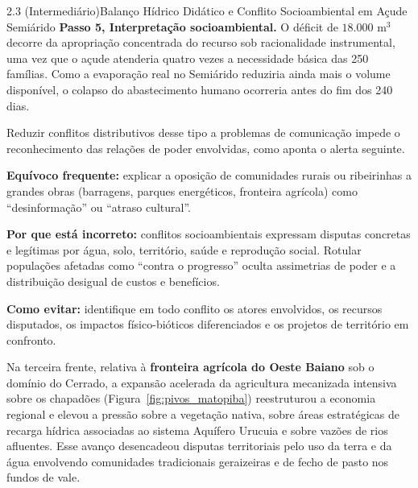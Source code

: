 \begin{boxExemplo}{2.3 (Intermediário)}{Balanço Hídrico Didático e Conflito Socioambiental em Açude Semiárido}
{\textbf{Passo 5, Interpretação socioambiental.} O déficit de $18.000\text{ m}^3$ decorre da apropriação concentrada do recurso sob racionalidade instrumental, uma vez que o açude atenderia quatro vezes a necessidade básica das 250 famílias. Como a evaporação real no Semiárido reduziria ainda mais o volume disponível, o colapso do abastecimento humano ocorreria antes do fim dos 240 dias.}
\end{boxExemplo}

Reduzir conflitos distributivos desse tipo a problemas de comunicação impede o reconhecimento das relações de poder envolvidas, como aponta o alerta seguinte.

\begin{boxErro}
\textbf{Equívoco frequente:} explicar a oposição de comunidades rurais ou ribeirinhas a grandes obras (barragens, parques energéticos, fronteira agrícola) como ``desinformação'' ou ``atraso cultural''.

\textbf{Por que está incorreto:} conflitos socioambientais expressam disputas concretas e legítimas por água, solo, território, saúde e reprodução social. Rotular populações afetadas como ``contra o progresso'' oculta assimetrias de poder e a distribuição desigual de custos e benefícios.

\textbf{Como evitar:} identifique em todo conflito os atores envolvidos, os recursos disputados, os impactos físico-bióticos diferenciados e os projetos de território em confronto.
\end{boxErro}

Na terceira frente, relativa à \textbf{fronteira agrícola do Oeste Baiano} sob o domínio do Cerrado, a expansão acelerada da agricultura mecanizada intensiva sobre os chapadões (Figura~\ref{fig:pivos_matopiba}) reestruturou a economia regional e elevou a pressão sobre a vegetação nativa, sobre áreas estratégicas de recarga hídrica associadas ao sistema Aquífero Urucuia e sobre vazões de rios afluentes. Esse avanço desencadeou disputas territoriais pelo uso da terra e da água envolvendo comunidades tradicionais geraizeiras e de fecho de pasto nos fundos de vale.

